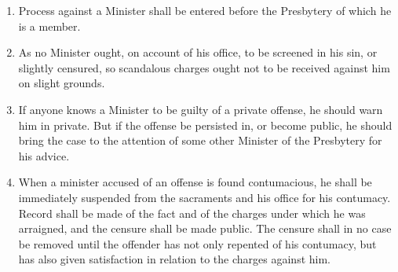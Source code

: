 \documentclass[
]{book}
\begin{document}
\protect\hypertarget{chapter-slug-38-special-rules-pertaining-to-process-against-a-minister}{\href{}{}}

\begin{enumerate}
\def\labelenumi{\arabic{enumi}.}
\item
  \protect\hypertarget{38}{\href{}{}}Process against a Minister shall be entered before the Presbytery of which he is a member.
\item
  As no Minister ought, on account of his office, to be screened in his sin, or slightly censured, so scandalous charges ought not to be received against him on slight grounds.
\item
  If anyone knows a Minister to be guilty of a private offense, he should warn him in private. But if the offense be persisted in, or become public, he should bring the case to the attention of some other Minister of the Presbytery for his advice.
\item
  \protect\hypertarget{38.4}{\href{}{}}When a minister accused of an offense is found contumacious, he shall be immediately suspended from the sacraments and his office for his contumacy. Record shall be made of the fact and of the charges under which he was arraigned, and the censure shall be made public. The censure shall in no case be removed until the offender has not only repented of his contumacy, but has also given satisfaction in relation to the charges against him.


\end{enumerate}
\end{document}
